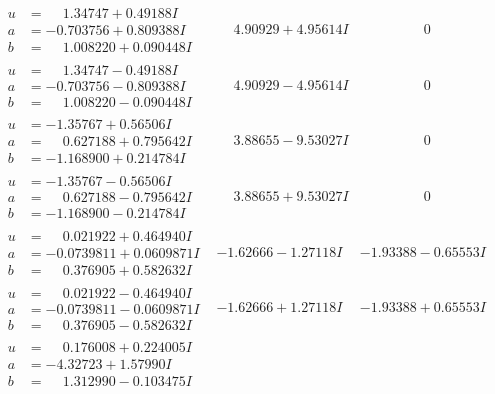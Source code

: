\documentclass[1p]{elsarticle_modified}
\theoremstyle{definition}
\begin{document}
$$\begin{array}{c|c|c}
\begin{aligned}
u &= \phantom{-}1.34747 + 0.49188 I \\
a &= -0.703756 + 0.809388 I \\
b &= \phantom{-}1.008220 + 0.090448 I\end{aligned}
 & \phantom{-}4.90929 + 4.95614 I & \phantom{-0.000000 } 0 \\ \hline\begin{aligned}
u &= \phantom{-}1.34747 - 0.49188 I \\
a &= -0.703756 - 0.809388 I \\
b &= \phantom{-}1.008220 - 0.090448 I\end{aligned}
 & \phantom{-}4.90929 - 4.95614 I & \phantom{-0.000000 } 0 \\ \hline\begin{aligned}
u &= -1.35767 + 0.56506 I \\
a &= \phantom{-}0.627188 + 0.795642 I \\
b &= -1.168900 + 0.214784 I\end{aligned}
 & \phantom{-}3.88655 - 9.53027 I & \phantom{-0.000000 } 0 \\ \hline\begin{aligned}
u &= -1.35767 - 0.56506 I \\
a &= \phantom{-}0.627188 - 0.795642 I \\
b &= -1.168900 - 0.214784 I\end{aligned}
 & \phantom{-}3.88655 + 9.53027 I & \phantom{-0.000000 } 0 \\ \hline\begin{aligned}
u &= \phantom{-}0.021922 + 0.464940 I \\
a &= -0.0739811 + 0.0609871 I \\
b &= \phantom{-}0.376905 + 0.582632 I\end{aligned}
 & -1.62666 - 1.27118 I & -1.93388 - 0.65553 I \\ \hline\begin{aligned}
u &= \phantom{-}0.021922 - 0.464940 I \\
a &= -0.0739811 - 0.0609871 I \\
b &= \phantom{-}0.376905 - 0.582632 I\end{aligned}
 & -1.62666 + 1.27118 I & -1.93388 + 0.65553 I \\ \hline\begin{aligned}
u &= \phantom{-}0.176008 + 0.224005 I \\
a &= -4.32723 + 1.57990 I \\
b &= \phantom{-}1.312990 - 0.103475 I\end{aligned}

\end{array}$$
\end{document}
